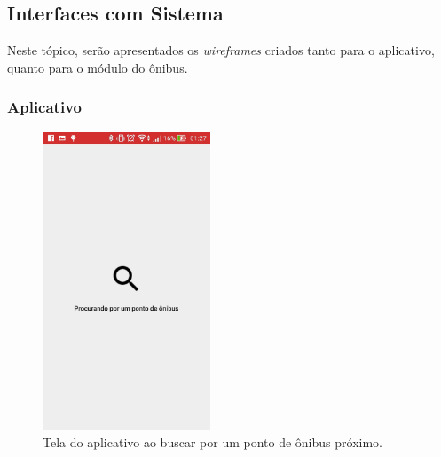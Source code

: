 \documentclass[
	12pt,				%
	oneside,			%
	a4paper,			%
	brazil				%
]{abntex2}
\begin{document}
\newpage

\subsection{Interfaces com Sistema}

Neste tópico, serão apresentados os \textit{wireframes} criados tanto para o aplicativo, quanto para o módulo do ônibus.

\subsubsection{Aplicativo}


\begin{figure}[!h]
\centering
\includegraphics[width=5cm, center]{images/beacon_searching_bus_stop}
\caption{Tela do aplicativo ao buscar por um ponto de ônibus próximo.}
\label{Rotulo}
\end{figure}
\end{document}
